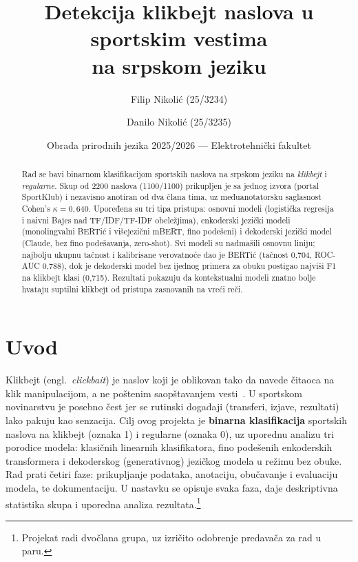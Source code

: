 \documentclass[11pt,a4paper]{article}
\title{\textbf{Detekcija klikbejt naslova u sportskim vestima\\ na srpskom jeziku}}
\author{Filip Nikolić (25/3234) \and Danilo Nikolić (25/3235)}
\date{Obrada prirodnih jezika 2025/2026 --- Elektrotehnički fakultet}
\begin{document}
\maketitle
\begin{abstract}
\noindent
Rad se bavi binarnom klasifikacijom sportskih naslova na srpskom jeziku na
\emph{klikbejt} i \emph{regularne}. Skup od 2200 naslova (1100/1100) prikupljen je
sa jednog izvora (portal SportKlub) i nezavisno anotiran od dva člana tima, uz
međuanotatorsku saglasnost Cohen's $\kappa = 0{,}640$. Upoređena su tri tipa
pristupa: osnovni modeli (logistička regresija i naivni Bajes nad TF/IDF/TF-IDF
obeležjima), enkoderski jezički modeli (monolingvalni BERTić i višejezični mBERT,
fino podešeni) i dekoderski jezički model (Claude, bez fino podešavanja, zero-shot).
Svi modeli su nadmašili osnovnu liniju; najbolju ukupnu tačnost i kalibrisane
verovatnoće dao je BERTić (tačnost 0{,}704, ROC-AUC 0{,}788), dok je dekoderski
model bez ijednog primera za obuku postigao najviši F1 na klikbejt klasi (0{,}715).
Rezultati pokazuju da kontekstualni modeli znatno bolje hvataju suptilni klikbejt
od pristupa zasnovanih na vreći reči.
\end{abstract}

\tableofcontents
\newpage

\section{Uvod}\label{sec:uvod}
Klikbejt (engl.\ \emph{clickbait}) je naslov koji je oblikovan tako da navede
čitaoca na klik manipulacijom, a ne poštenim saopštavanjem vesti~\cite{potthast2016clickbait,chakraborty2016stopclickbait}. U sportskom
novinarstvu je posebno čest jer se rutinski događaji (transferi, izjave, rezultati)
lako pakuju kao senzacija. Cilj ovog projekta je \textbf{binarna klasifikacija}
sportskih naslova na klikbejt (oznaka 1) i regularne (oznaka 0), uz uporednu
analizu tri porodice modela: klasičnih linearnih klasifikatora, fino podešenih
enkoderskih transformera i dekoderskog (generativnog) jezičkog modela u režimu bez
obuke. Rad prati četiri faze: prikupljanje podataka, anotaciju, obučavanje i
evaluaciju modela, te dokumentaciju. U nastavku se opisuje svaka faza, daje
deskriptivna statistika skupa i uporedna analiza rezultata.\footnote{Projekat
radi dvočlana grupa, uz izričito odobrenje predavača za rad u paru.}
\end{document}
